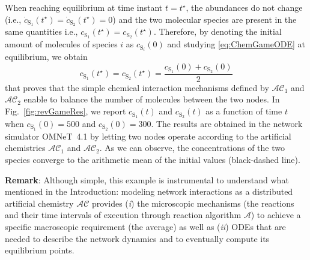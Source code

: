 \documentclass[journal]{IEEEtran}
\newcommand{\mol}[1]{\ensuremath{\textrm{#1}}}
\begin{document}
{When reaching equilibrium at time instant $t=t^\star$, the abundances do not change (i.e., $\dot{c}_{\mol{S}_1}(t^\star) = \dot{c}_{\mol{S}_2}(t^\star) =0$) and the two molecular species are present in the same quantities i.e., $c_{\mol{S}_1}(t^\star) = c_{\mol{S}_2}(t^\star)$. Therefore, by denoting the initial amount of molecules of species $i$ as $c_{\mol{S}_i}(0)$ and {studying \eqref{eq:ChemGameODE} at equilibrium}{,} we obtain 
\begin{equation}\label{EqPointRev}
c_{\mol{S}_1}(t^\star) = c_{\mol{S}_2}(t^\star)=\frac{c_{\mol{S}_1}(0)+c_{\mol{S}_2}(0)}{2}
\end{equation}
{{that proves that the simple} {chemical interaction mechanisms} defined by $\mathcal{AC}_1$ and $\mathcal{AC}_2$ enable to balance the number of molecules between the two nodes. In Fig.~\ref{fig:revGameRes}, we report $c_{\mol{S}_1}(t)$ and $c_{\mol{S}_2}(t)$ as a function of time $t$ when $c_{\mol{S}_1}(0) =500$ and $c_{\mol{S}_2}(0) =300$. The results are obtained in the network simulator OMNeT~4.1 by letting two nodes operate according to the artificial chemistries $\mathcal{AC}_1$ and $\mathcal{AC}_2$. As we can observe, the concentrations of the two species converge to the arithmetic mean of the initial values (black-dashed line).}

{{\bf{Remark}}: Although simple, this example is instrumental to understand what mentioned in the Introduction: modeling network interactions as a distributed artificial chemistry $\mathcal {AC}$ provides (\emph{i}) the microscopic mechanisms (the reactions and their time intervals of execution through reaction algorithm $\mathcal A$) to achieve a specific macroscopic requirement (the average) as well as (\emph{ii}) ODEs that are needed to describe the network dynamics and to eventually compute its equilibrium points.}


}
\end{document}
